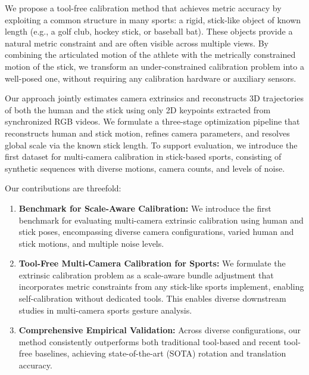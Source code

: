 \documentclass[a4paper, 10pt, conference]{ieeeconf}      %
\newcommand{\eg}{e.g.,\xspace}
\begin{document}
We propose a tool-free calibration method that achieves metric accuracy by exploiting a common structure in many sports: a rigid, stick-like object of known length (\eg a golf club, hockey stick, or baseball bat). These objects provide a natural metric constraint and are often visible across multiple views. By combining the articulated motion of the athlete with the metrically constrained motion of the stick, we transform an under-constrained calibration problem into a well-posed one, without requiring any calibration hardware or auxiliary sensors.

Our approach jointly estimates camera extrinsics and reconstructs 3D trajectories of both the human and the stick using only 2D keypoints extracted from synchronized RGB videos. We formulate a three-stage optimization pipeline that reconstructs human and stick motion, refines camera parameters, and resolves global scale via the known stick length. To support evaluation, we introduce the first dataset for multi-camera calibration in stick-based sports, consisting of synthetic sequences with diverse motions, camera counts, and levels of noise.

Our contributions are threefold:
\begin{enumerate}%
\item \textbf{Benchmark for Scale-Aware Calibration:} We introduce the first benchmark for evaluating multi-camera extrinsic calibration using human and stick poses, encompassing diverse camera configurations, varied human and stick motions, and multiple noise levels.
\item \textbf{Tool-Free Multi-Camera Calibration for Sports:} We formulate the extrinsic calibration problem as a scale-aware bundle adjustment that incorporates metric constraints from any stick-like sports implement, enabling self-calibration without dedicated tools. This enables diverse downstream studies in multi-camera sports gesture analysis.
\item \textbf{Comprehensive Empirical Validation:} Across diverse configurations, our method consistently outperforms both traditional tool-based and recent tool-free baselines, achieving state-of-the-art (SOTA) rotation and translation accuracy.
\end{enumerate}







\end{document}
